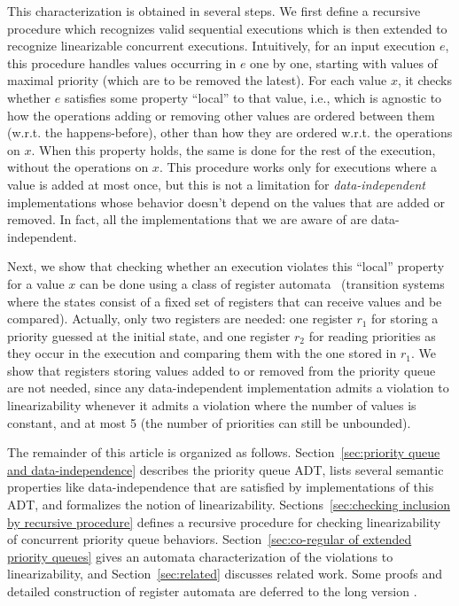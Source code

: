 This characterization is obtained in several steps. We first define a recursive procedure which recognizes valid sequential executions which is then extended to recognize linearizable concurrent executions. Intuitively, for an input execution $e$, this procedure handles values occurring in $e$ one by one, starting with values of maximal priority (which are to be removed the latest). For each value $x$, it checks whether $e$ satisfies some property ``local'' to that value, i.e., which is agnostic to how the operations adding or removing other values are ordered between them (w.r.t. the happens-before), other than how they are ordered w.r.t. the operations on $x$. When this property holds, the same is done for the rest of the execution, without the operations on $x$. This procedure works only for executions where a value is added at most once, but this is not a limitation for \emph{data-independent} implementations whose behavior doesn't depend on the values that are added or removed. In fact, all the implementations that we are aware of are data-independent.

Next, we show that checking whether an execution violates this ``local'' property for a value $x$ can be done using a class of register automata~\cite{DBLP:journals/tcs/KaminskiF94,DBLP:conf/icalp/Cerans94,DBLP:conf/stacs/SegoufinT11} (transition systems where the states consist of a fixed set of registers that can receive values and be compared). Actually, only two registers are needed: one register $r_1$ for storing a priority guessed at the initial state, and one register $r_2$ for reading priorities as they occur in the execution and comparing them with the one stored in $r_1$. We show that registers storing values added to or removed from the priority queue are not needed, since any data-independent implementation admits a violation to linearizability whenever it admits a violation where the number of values is constant, and at most 5 (the number of priorities can still be unbounded).

The remainder of this article is organized as follows.
Section~\ref{sec:priority queue and data-independence} describes the priority queue ADT, lists several semantic properties like data-independence that are satisfied by implementations of this ADT, and formalizes the notion of linearizability.
Sections~\ref{sec:checking inclusion by recursive procedure} defines a recursive procedure for checking linearizability of concurrent priority queue behaviors.
Section~\ref{sec:co-regular of extended priority queues} gives an automata characterization of the violations to linearizability, and
Section~\ref{sec:related} discusses related work. {\color {red}Some proofs and detailed construction of register automata are deferred to the long version \cite{CONCUR2017Ahmed}.} 




